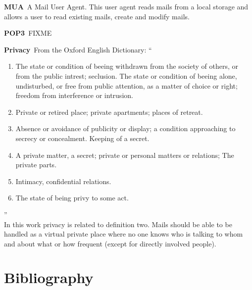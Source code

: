 \documentclass[10pt,a4paper]{book}
\newenvironment{entry}{\par\leavevmode\hangpara{1.5mm}{1}\ignorespaces}{\RaggedRight\par}
\newcommand*{\mainentry}[2]{{\bfseries{#1\label{def:#1}}}~#2\par}
\begin{document}
\begin{appendices}
\begin{entry}
  \mainentry{MUA}{A Mail User Agent. This user agent reads mails from a local storage and allows a user to read existing mails, create and modify mails.}
\end{entry}

\begin{entry}
  \mainentry{POP3}{FIXME}
\end{entry}

\begin{entry}
  \mainentry{Privacy}{From the Oxford English Dictionary: ``
    \begin{enumerate}
      \item The state or condition of beeing withdrawn from the society of others, or from the public intrest; seclusion. The state or condition of beeing alone, undisturbed, or free from public attention, as a matter of choice or right; freedom from interference or intrusion.
      \item Private or retired place; private apartments; places of retreat.
      \item Absence or avoidance of publicity or display; a condition approaching to secrecy or concealment. Keeping of a secret.
      \item A private matter, a secret; private or personal matters or relations; The private parts.
      \item Intimacy, confidential relations.
      \item The state of being privy to some act.
    \end{enumerate}''\cite[FIXME]{OXFORD}\\
    In this work privacy is related to definition two. Mails should be able to be handled as a virtual private place where no one knows who is talking to whom and about what or how frequent (except for directly involved people).
  }
\end{entry}

\chapter{Bibliography}
\printbibliography[title={},heading=none]

\printindex

\begin{comment}

\end{comment}

\end{appendices}
\end{document}
